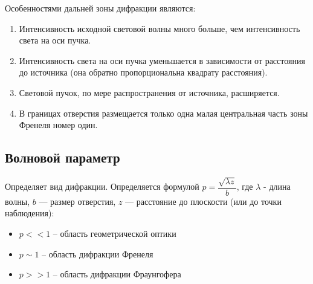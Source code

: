 Особенностями дальней зоны дифракции являются: 

\begin{enumerate}
	\item Интенсивность исходной световой волны много больше, чем интенсивность света на оси пучка. 
	
	\item Интенсивность света на оси пучка уменьшается в зависимости от расстояния до источника (она обратно пропорциональна квадрату расстояния).
	
	\item Световой пучок, по мере распространения от источника, расширяется.
	
	\item В границах отверстия размещается только одна малая центральная часть зоны Френеля номер один.
\end{enumerate}	

\subsection{Волновой параметр}

 Определяет вид дифракции. Определяется формулой $p=\dfrac{\sqrt{\lambda z}}{b}$, где $\lambda$ - длина волны, $b$ --- размер отверстия, $z$ --- расстояние до плоскости (или до точки наблюдения):

\begin{itemize}
	\item $p<<1$ -- область геометрической оптики
	
	\item $p \sim 1$ -- область дифракции Френеля 
	
	\item $p>>1$ -- область дифракции Фраунгофера 
\end{itemize}